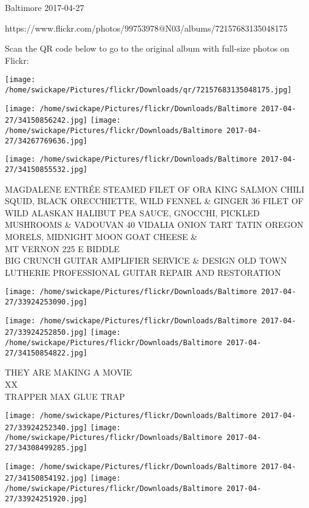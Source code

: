 \documentclass[10pt,letterpaper]{article}
\begin{document}
Baltimore 2017-04-27

https://www.flickr.com/photos/99753978@N03/albums/72157683135048175

Scan the QR code below to go to the original album with full-size photos on Flickr:

\texttt{[image: /home/swickape/Pictures/flickr/Downloads/qr/72157683135048175.jpg]}
\pagebreak

\texttt{[image: /home/swickape/Pictures/flickr/Downloads/Baltimore 2017-04-27/34150856242.jpg]}
\texttt{[image: /home/swickape/Pictures/flickr/Downloads/Baltimore 2017-04-27/34267769636.jpg]}

\texttt{[image: /home/swickape/Pictures/flickr/Downloads/Baltimore 2017-04-27/34150855532.jpg]}

MAGDALENE ENTRÉE STEAMED FILET OF ORA KING SALMON CHILI SQUID, BLACK ORECCHIETTE, WILD FENNEL \& GINGER 36 FILET OF WILD ALASKAN HALIBUT PEA SAUCE, GNOCCHI, PICKLED MUSHROOMS \& VADOUVAN 40 VIDALIA ONION TART TATIN OREGON MORELS, MIDNIGHT MOON GOAT CHEESE \&\\
MT VERNON 225 E BIDDLE\\
BIG CRUNCH GUITAR AMPLIFIER SERVICE \& DESIGN OLD TOWN LUTHERIE PROFESSIONAL GUITAR REPAIR AND RESTORATION\\
\pagebreak

\texttt{[image: /home/swickape/Pictures/flickr/Downloads/Baltimore 2017-04-27/33924253090.jpg]}

\vspace{0.25in}
\texttt{[image: /home/swickape/Pictures/flickr/Downloads/Baltimore 2017-04-27/33924252850.jpg]}
\texttt{[image: /home/swickape/Pictures/flickr/Downloads/Baltimore 2017-04-27/34150854822.jpg]}

THEY ARE MAKING A MOVIE\\
XX\\
TRAPPER MAX GLUE TRAP\\
\pagebreak

\texttt{[image: /home/swickape/Pictures/flickr/Downloads/Baltimore 2017-04-27/33924252340.jpg]}
\texttt{[image: /home/swickape/Pictures/flickr/Downloads/Baltimore 2017-04-27/34308499285.jpg]}

\texttt{[image: /home/swickape/Pictures/flickr/Downloads/Baltimore 2017-04-27/34150854192.jpg]}
\texttt{[image: /home/swickape/Pictures/flickr/Downloads/Baltimore 2017-04-27/33924251920.jpg]}
\end{document}
